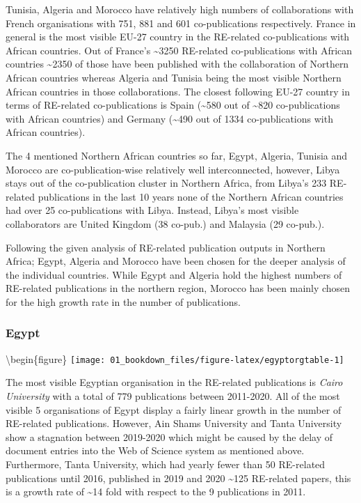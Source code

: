 \documentclass[
]{book}
\begin{document}
Tunisia, Algeria and Morocco have relatively high numbers of collaborations with French organisations with 751, 881 and 601 co-publications respectively. France in general is the most visible EU-27 country in the RE-related co-publications with African countries. Out of France's \textasciitilde3250 RE-related co-publications with African countries \textasciitilde2350 of those have been published with the collaboration of Northern African countries whereas Algeria and Tunisia being the most visible Northern African countries in those collaborations. The closest following EU-27 country in terms of RE-related co-publications is Spain (\textasciitilde580 out of \textasciitilde820 co-publications with African countries) and Germany (\textasciitilde490 out of 1334 co-publications with African countries).

The 4 mentioned Northern African countries so far, Egypt, Algeria, Tunisia and Morocco are co-publication-wise relatively well interconnected, however, Libya stays out of the co-publication cluster in Northern Africa, from Libya's 233 RE-related publications in the last 10 years none of the Northern African countries had over 25 co-publications with Libya. Instead, Libya's most visible collaborators are United Kingdom (38 co-pub.) and Malaysia (29 co-pub.).

Following the given analysis of RE-related publication outputs in Northern Africa;
Egypt, Algeria and Morocco have been chosen for the deeper analysis of the individual countries.
While Egypt and Algeria hold the highest numbers of RE-related publications in the northern
region, Morocco has been mainly chosen for the high growth rate in the number of publications.

\hypertarget{egypt}{%
\subsubsection{Egypt}\label{egypt}}

\textbackslash begin\{figure\}
\texttt{[image: 01\_bookdown\_files/figure-latex/egyptorgtable-1]}

The most visible Egyptian organisation in the RE-related publications is \emph{Cairo University} with a total of 779 publications between 2011-2020. All of the most visible 5 organisations of Egypt display a fairly linear growth in the number of RE-related publications. However, Ain Shams University and Tanta University show a stagnation between 2019-2020 which might be caused by the delay of document entries into the Web of Science system as mentioned above. Furthermore, Tanta University, which had yearly fewer than 50 RE-related publications until 2016, published in 2019 and 2020 \textasciitilde125 RE-related papers, this is a growth rate of \textasciitilde14 fold with respect to the 9 publications in 2011.
\end{document}
